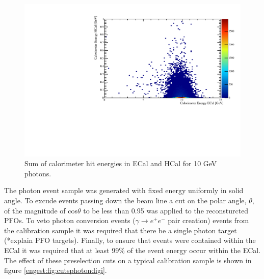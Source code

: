 \begin{figure}
  \includegraphics[width=\largefigwidth]{EnergyEstimators/Plots/Calibration/Digitsation/ECal/10GeVPhotonEnergyECalHCal.pdf}
  \caption[Sum of calorimeter hit energies in ECal and HCal for 10 GeV photons.]{Sum of calorimeter hit energies in ECal and HCal for 10 GeV photons.}
  \label{engest:fig:energysplitphotondigi}
\end{figure}

The photon event sample was generated with fixed energy uniformly in solid angle.  To excude events passing down the beam line a cut on the polar angle, $\theta$, of the magnitude of cos$\theta$ to be less than 0.95 was applied to the reconsturcted PFOs.  To veto photon conversion events ($\gamma \rightarrow e^{+}e^{-}$ pair creation) events from the calibration sample it was required that there be a single photon target (*explain PFO targets).  Finally, to ensure that events were contained within the ECal it was required that at least 99\% of the event energy occur within the ECal.  The effect of these preselection cuts on a typical calibration sample is shown in figure \ref{engest:fig:cutsphotondigi}.  

